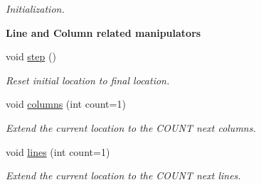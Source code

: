 \begin{DoxyCompactItemize}
\begin{DoxyCompactList}\small\item\em Initialization. \end{DoxyCompactList}\end{DoxyCompactItemize}
\begin{Indent}{\bf Line and Column related manipulators}\par
\begin{DoxyCompactItemize}
\item 
void \hyperlink{classEzAquarii_1_1location_acf36facf71d7a487c5f0b6d842cc131e}{step} ()\hypertarget{classEzAquarii_1_1location_acf36facf71d7a487c5f0b6d842cc131e}{}\label{classEzAquarii_1_1location_acf36facf71d7a487c5f0b6d842cc131e}

\begin{DoxyCompactList}\small\item\em Reset initial location to final location. \end{DoxyCompactList}\item 
void \hyperlink{classEzAquarii_1_1location_aa28f227132ae57c28625c819ce4f0cd0}{columns} (int count=1)\hypertarget{classEzAquarii_1_1location_aa28f227132ae57c28625c819ce4f0cd0}{}\label{classEzAquarii_1_1location_aa28f227132ae57c28625c819ce4f0cd0}

\begin{DoxyCompactList}\small\item\em Extend the current location to the C\+O\+U\+NT next columns. \end{DoxyCompactList}\item 
void \hyperlink{classEzAquarii_1_1location_ad63e80d670f482a693e727c9a0f4e7a0}{lines} (int count=1)\hypertarget{classEzAquarii_1_1location_ad63e80d670f482a693e727c9a0f4e7a0}{}\label{classEzAquarii_1_1location_ad63e80d670f482a693e727c9a0f4e7a0}

\begin{DoxyCompactList}\small\item\em Extend the current location to the C\+O\+U\+NT next lines. \end{DoxyCompactList}\end{DoxyCompactItemize}
\end{Indent}
